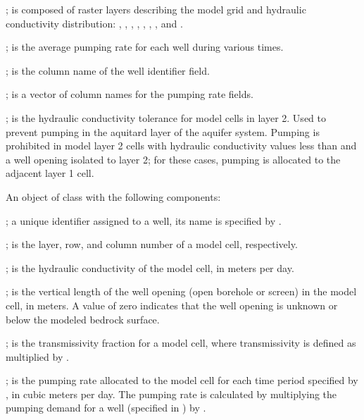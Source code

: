 \documentclass[a4paper]{book}
\begin{document}
%
\begin{Arguments}
\begin{ldescription}
\item[\code{rs.model}] ; is composed of raster layers describing the model grid and hydraulic conductivity distribution:
, , , , , , , and .
\item[\code{wells}] ; is the average pumping rate for each well during various times.
\item[\code{well.col}] ; is the column name of the well identifier field.
\item[\code{rate.col}] ; is a vector of column names for the pumping rate fields.
\item[\code{lay2.hk.tol}] ; is the hydraulic conductivity tolerance for model cells in layer 2.
Used to prevent pumping in the aquitard layer of the aquifer system.
Pumping is prohibited in model layer 2 cells with hydraulic conductivity values less than  and a well opening isolated to layer 2;
for these cases, pumping is allocated to the adjacent layer 1 cell.
\end{ldescription}
\end{Arguments}
%
\begin{Value}
An object of  class with the following components:
\begin{ldescription}
\item[\code{...}] ; a unique identifier assigned to a well, its name is specified by .
\item[\code{lay, row, col}] ; is the layer, row, and column number of a model cell, respectively.
\item[\code{hk}] ; is the hydraulic conductivity of the model cell, in meters per day.
\item[\code{thk}] ; is the vertical length of the well opening (open borehole or screen) in the model cell, in meters.
A value of zero indicates that the well opening is unknown or below the modeled bedrock surface.
\item[\code{frac}] ; is the transmissivity fraction for a model cell, where transmissivity is defined as  multiplied by .
\item[\code{...}] ; is the pumping rate allocated to the model cell for each time period specified by , in cubic meters per day.
The pumping rate is calculated by multiplying the pumping demand for a well (specified in ) by .
\end{ldescription}
\end{Value}
\end{document}
